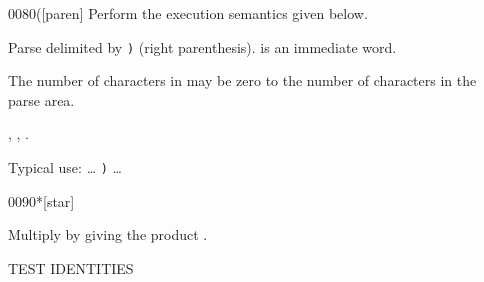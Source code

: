 \begin{worddef}[p]{0080}{(}[paren]
\compile
	Perform the execution semantics given below.

\execute

	Parse  delimited by \texttt{)}
	(right parenthesis).
	 is an immediate word.

	The number of characters in  may be zero to the
	number of characters in the parse area.

\see {},
	,
	.

	\begin{rationale} %
		Typical use: {\ldots}  \texttt{)} {\ldots}
	\end{rationale}
\end{worddef}


\begin{worddef}{0090}{*}[star]
\item {}

	Multiply  by  giving the product
	.

	\begin{testing} %
		 \tab[4]  TEST IDENTITIE{\bs}S \\
		 \\
		 \\
		 \\
		 \\
		 \\
		 \\
		 \\

		 \\
		 \\
		 \\
	\end{testing}
\end{worddef}


